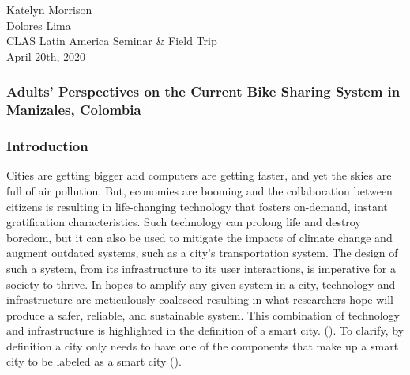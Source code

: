 \documentclass[12pt]{article}
\begin{document}
\begin{flushleft}

Katelyn Morrison\\
Dolores Lima\\
CLAS Latin America Seminar \& Field Trip\\
April 20th, 2020\\
\end{flushleft}

\begin{center}
\subsubsection*{Adults' Perspectives on the Current Bike Sharing System in Manizales, Colombia}
\end{center}

\subsubsection*{Introduction}
Cities are getting bigger and computers are getting faster, and yet the skies are full of air pollution. But, economies are booming and the collaboration between citizens is resulting in life-changing technology that fosters on-demand, instant gratification characteristics. Such technology can prolong life and destroy boredom, but it can also be used to mitigate the impacts of climate change and augment outdated systems, such as a city's transportation system. The design of such a system, from its infrastructure to its user interactions, is imperative for a society to thrive. In hopes to amplify any given system in a city, technology and infrastructure are meticulously coalesced resulting in what researchers hope will produce a safer, reliable, and sustainable system. This combination of technology and infrastructure is highlighted in the definition of a smart city. (\cite{montoya2017acceso}). To clarify, by definition a city only needs to have one of the components that make up a smart city to be labeled as a smart city (\cite{montoya2017acceso}). 
\end{document}

